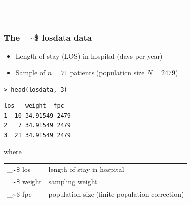 \documentclass[framenumber,t]{beamer}
\makeatletter
\newcommand\code{\bgroup\@makeother\_\@makeother\~\@makeother\$\@makeother\^\@codex}
\def\@codex#1{{\normalfont\ttfamily\hyphenchar\font=-1 #1}\egroup}
\makeatother
\begin{document}
\bgroup
{}
\begin{frame}[c,plain]{}
\begin{center}
    \textcolor{white}{\large PART 1}\\
    \vspace{1em}
    \textcolor{white}{\Huge Basic Robust Estimators}
\end{center}
\end{frame}
\egroup

\begin{frame}[fragile]
\frametitle{The \code{losdata} data}
    \begin{itemize}
        \setlength\itemsep{0.5em}
        \item \alert{Length of stay} (LOS) in hospital (days per year)
        \item \alert{Sample} of $n = 71$ patients (population size $N = 2479$)
    \end{itemize}
    \begin{lstlisting}[style=in_big]
> head(losdata, 3)
    \end{lstlisting}
    \begin{lstlisting}[style=out_big]
  los   weight  fpc
1  10 34.91549 2479
2   7 34.91549 2479
3  21 34.91549 2479
    \end{lstlisting}
    where\\
    \vspace{0.5em}
    \begin{tabular}{ll}
        \code{los} & length of stay in hospital\\
        \code{weight} & sampling weight\\
        \code{fpc} & population size (finite population correction)\\
    \end{tabular}
\end{frame}
\end{document}
